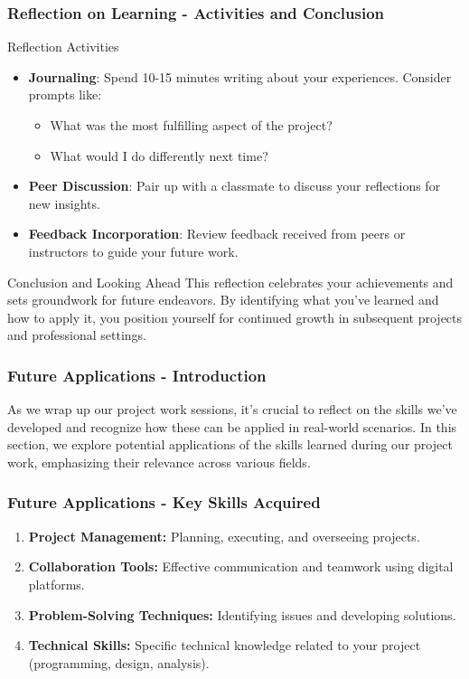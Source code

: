 \documentclass[aspectratio=169]{beamer}
\begin{document}
\begin{frame}[fragile]
    \frametitle{Reflection on Learning - Activities and Conclusion}
    \begin{block}{Reflection Activities}
        \begin{itemize}
            \item \textbf{Journaling}: Spend 10-15 minutes writing about your experiences. Consider prompts like:
                \begin{itemize}
                    \item What was the most fulfilling aspect of the project?
                    \item What would I do differently next time?
                \end{itemize}
            \item \textbf{Peer Discussion}: Pair up with a classmate to discuss your reflections for new insights.
            \item \textbf{Feedback Incorporation}: Review feedback received from peers or instructors to guide your future work.
        \end{itemize}
    \end{block}

    \begin{block}{Conclusion and Looking Ahead}
        This reflection celebrates your achievements and sets groundwork for future endeavors. By identifying what you’ve learned and how to apply it, you position yourself for continued growth in subsequent projects and professional settings.
    \end{block}
\end{frame}

\begin{frame}[fragile]
  \frametitle{Future Applications - Introduction}
  As we wrap up our project work sessions, it’s crucial to reflect on the skills we've developed and recognize how these can be applied in real-world scenarios. In this section, we explore potential applications of the skills learned during our project work, emphasizing their relevance across various fields.
\end{frame}

\begin{frame}[fragile]
  \frametitle{Future Applications - Key Skills Acquired}
  \begin{enumerate}
    \item \textbf{Project Management:} Planning, executing, and overseeing projects.
    \item \textbf{Collaboration Tools:} Effective communication and teamwork using digital platforms.
    \item \textbf{Problem-Solving Techniques:} Identifying issues and developing solutions.
    \item \textbf{Technical Skills:} Specific technical knowledge related to your project (programming, design, analysis).
  \end{enumerate}
\end{frame}
\end{document}
